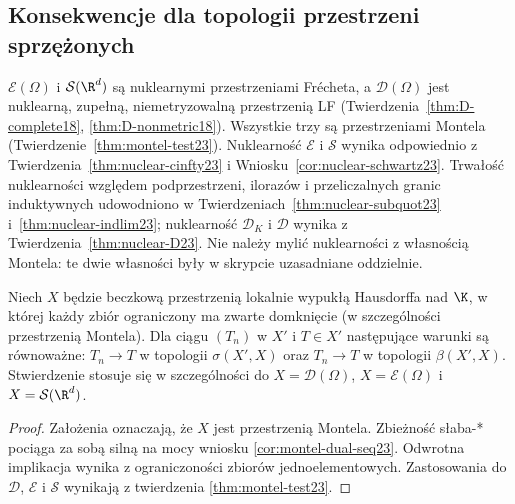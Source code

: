 \subsection{Konsekwencje dla topologii przestrzeni sprzężonych}

\begin{uwaga}
\label{rem:tabela-struktur25}
$\mathcal E(\Omega)$ i $\mathcal S(\R^d)$ są nuklearnymi
przestrzeniami Frécheta, a $\mathcal D(\Omega)$ jest nuklearną,
zupełną, niemetryzowalną przestrzenią LF
(Twierdzenia~\ref{thm:D-complete18}, \ref{thm:D-nonmetric18}).
Wszystkie trzy są przestrzeniami Montela
(Twierdzenie~\ref{thm:montel-test23}).
Nuklearność $\mathcal E$ i $\mathcal S$ wynika odpowiednio
z Twierdzenia~\ref{thm:nuclear-cinfty23}
i Wniosku~\ref{cor:nuclear-schwartz23}.
Trwałość nuklearności względem podprzestrzeni, ilorazów
i przeliczalnych granic induktywnych udowodniono w
Twierdzeniach~\ref{thm:nuclear-subquot23} i~\ref{thm:nuclear-indlim23};
nuklearność $\mathcal D_K$ i $\mathcal D$ wynika z
Twierdzenia~\ref{thm:nuclear-D23}. Nie należy mylić nuklearności
z własnością Montela: te dwie własności były w skrypcie
uzasadniane oddzielnie.
\end{uwaga}
\begin{twierdzenie}
\label{thm:weak-strong-sequences25}
Niech $X$ będzie beczkową przestrzenią lokalnie wypukłą
Hausdorffa nad $\K$, w której każdy zbiór ograniczony
ma zwarte domknięcie (w szczególności przestrzenią Montela).
Dla ciągu $(T_n)$ w $X'$ i $T\in X'$ następujące
warunki są równoważne: $T_n\to T$ w topologii
$\sigma(X',X)$ oraz $T_n\to T$ w topologii $\beta(X',X)$.
Stwierdzenie stosuje się w szczególności do
$X=\mathcal D(\Omega)$, $X=\mathcal E(\Omega)$ i
$X=\mathcal S(\R^d)$.
\end{twierdzenie}
\begin{proof}
Założenia oznaczają, że $X$ jest przestrzenią Montela.
Zbieżność słaba-* pociąga za sobą silną na mocy wniosku
\ref{cor:montel-dual-seq23}. Odwrotna implikacja wynika
z ograniczoności zbiorów jednoelementowych.
Zastosowania do $\mathcal D$, $\mathcal E$ i $\mathcal S$
wynikają z twierdzenia \ref{thm:montel-test23}.
\end{proof}



